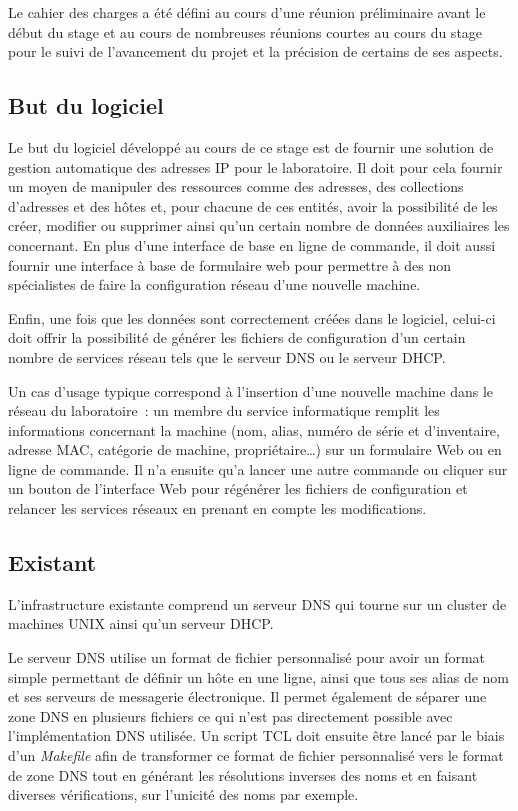 \documentclass[12pt,a4paper,twoside]{report}
\begin{document}
Le cahier des charges a été défini au cours d’une réunion préliminaire avant
le début du stage et au cours de nombreuses réunions courtes au cours du stage
pour le suivi de l’avancement du projet et la précision de certains de ses
aspects.

\subsection{But du logiciel}

Le but du logiciel développé au cours de ce stage est de fournir une solution
de gestion automatique des adresses IP pour le laboratoire. Il doit pour cela
fournir un moyen de manipuler des ressources comme des adresses, des
collections d’adresses et des hôtes et, pour chacune de ces entités, avoir la
possibilité de les créer, modifier ou supprimer ainsi qu’un certain nombre de
données auxiliaires les concernant. En plus d'une interface de base en ligne
de commande, il doit aussi fournir une interface à base de formulaire web
pour permettre à des non spécialistes de faire la configuration réseau d'une
nouvelle machine.

Enfin, une fois que les données sont correctement créées dans le logiciel,
celui-ci doit offrir la possibilité de générer les fichiers de configuration
d’un certain nombre de services réseau tels que le serveur DNS ou le serveur
DHCP.

Un cas d’usage typique correspond à l’insertion d’une nouvelle machine dans le
réseau du laboratoire~: un membre du service informatique remplit les
informations concernant la machine (nom, alias, numéro de série et
d’inventaire, adresse MAC, catégorie de machine, propriétaire\dots) sur un
formulaire Web ou en ligne de commande. Il n’a ensuite qu’a lancer une autre
commande ou cliquer sur un bouton de l’interface Web pour régénérer les
fichiers de configuration et relancer les services réseaux en prenant en
compte les modifications.


\subsection{Existant}

L’infrastructure existante comprend un serveur DNS qui tourne sur un cluster de
machines UNIX ainsi qu’un serveur DHCP.

Le serveur DNS utilise un format de fichier personnalisé pour avoir un format
simple permettant de définir un hôte en une ligne, ainsi que tous ses alias de
nom et ses serveurs de messagerie électronique. Il permet également de séparer
une zone DNS en plusieurs fichiers ce qui n’est pas directement possible avec
l’implémentation DNS utilisée. Un script TCL doit ensuite être lancé par le
biais d’un \emph{Makefile} afin de transformer ce format de fichier
personnalisé vers le format de zone DNS tout en générant les résolutions
inverses des noms et en faisant diverses vérifications, sur l’unicité des noms
par exemple.
\end{document}
